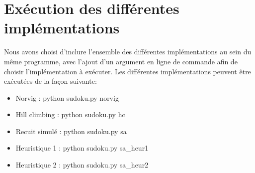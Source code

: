 \documentclass[12pt]{article}
\begin{document}
\section{Exécution des différentes implémentations}
Nous avons choisi d'inclure l'ensemble des différentes implémentations au sein du même programme, avec l'ajout d'un argument en ligne de commande afin de choisir l'implémentation à exécuter. Les différentes implémentations peuvent être exécutées de la façon suivante:
\begin{itemize}
  \item Norvig : python sudoku.py norvig
  \item Hill climbing : python sudoku.py hc
  \item Recuit simulé : python sudoku.py sa
  \item Heuristique 1 : python sudoku.py sa\_heur1
  \item Heuristique 2 : python sudoku.py sa\_heur2
\end{itemize}
\end{document}
